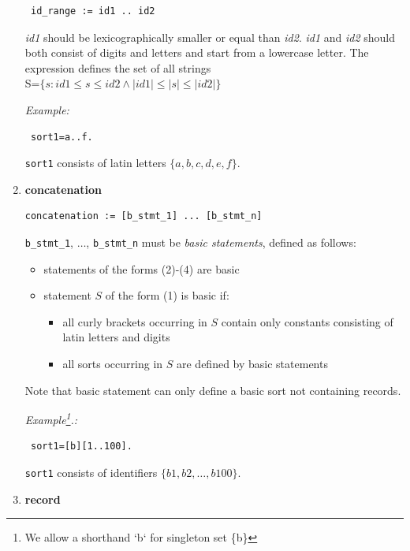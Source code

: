 \documentclass[12pt, letterpaper]{article}
\begin{document}
\begin{enumerate}
\begin{verbatim}
 id_range := id1 .. id2
\end{verbatim}

\textit{id1} should be lexicographically smaller or equal than \textit{id2}. 
\textit{id1} and \textit{id2} should both consist of digits and letters and start from a lowercase letter.
The expression defines the set of all strings \\ S=$\{s: id1\leq s \leq id2 \land |id1|\leq |s| \leq |id2|\}$



\textit{Example:}

\begin{verbatim}
 sort1=a..f.
\end{verbatim}
\texttt{sort1} consists of latin letters $\{a,b,c,d,e,f\}$.

\item \textbf{concatenation}
\begin{verbatim}
concatenation := [b_stmt_1] ... [b_stmt_n]
\end{verbatim}

\texttt{b\_stmt\_1}, $\dots$, \texttt{b\_stmt\_n} must be \textit{basic statements}, defined as follows:


\begin{itemize}
 \item statements of the forms (2)-(4) are basic
 \item statement $S$ of the form (1) is basic if:
 \begin{itemize}
  \item all curly brackets occurring in $S$ contain only constants consisting of latin letters and digits
  \item all sorts occurring in $S$ are defined by basic statements 
 \end{itemize}
\end{itemize}
Note that basic statement can only define a basic sort not containing records.

\textit{Example\footnote{We allow a shorthand `b` for singleton  set \{b\}}.:}

\begin{verbatim}
 sort1=[b][1..100].
\end{verbatim}

\texttt{sort1} consists of identifiers $\{b1,b2,\dots, b100\}$.


\item \textbf{record}



\end{enumerate}
\end{document}
